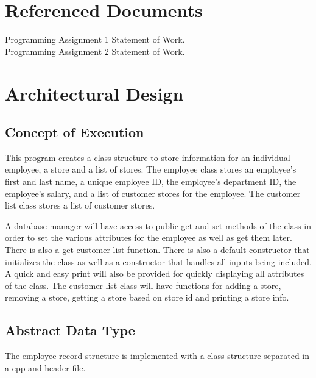 \documentclass[12pt]{article}%
\begin{document}
\section{Referenced Documents}
Programming Assignment 1 Statement of Work. \\
Programming Assignment 2 Statement of Work.

\section{Architectural Design}
\subsection{Concept of Execution}
This program creates a class structure to store information for an
individual employee, a store and a list of stores. The employee class stores an
employee's first and last name, a unique employee ID, the employee's department ID, the employee's salary,
and a list of customer stores for the employee. The customer list class stores a list of customer stores.

A database manager will have access to public get and set methods of the class
in order to set the various attributes for the employee as well as get them later.
There is also a get customer list function.
There is also a default constructor that initializes the class as well as a constructor
that handles all inputs being included. A quick and easy print will also be provided for quickly
displaying all attributes of the class.
The customer list class will have functions
for adding a store, removing a store, getting a store based on store id and printing a store info.

\subsection{Abstract Data Type}
The employee record structure is implemented with a class structure separated in a cpp and header file.
\end{document}
